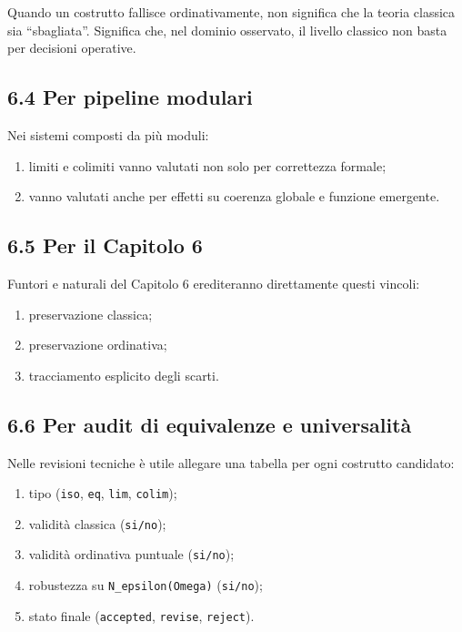 Quando un costrutto fallisce ordinativamente, non significa che la teoria classica sia ``sbagliata''. Significa che, nel dominio osservato, il livello classico non basta per decisioni operative.

\subsection{6.4 Per pipeline modulari}

Nei sistemi composti da più moduli:

\begin{enumerate}
\def\labelenumi{\arabic{enumi}.}
\tightlist
\item
  limiti e colimiti vanno valutati non solo per correttezza formale;
\item
  vanno valutati anche per effetti su coerenza globale e funzione emergente.
\end{enumerate}

\subsection{6.5 Per il Capitolo 6}

Funtori e naturali del Capitolo 6 erediteranno direttamente questi vincoli:

\begin{enumerate}
\def\labelenumi{\arabic{enumi}.}
\tightlist
\item
  preservazione classica;
\item
  preservazione ordinativa;
\item
  tracciamento esplicito degli scarti.
\end{enumerate}

\subsection{6.6 Per audit di equivalenze e universalità}

Nelle revisioni tecniche è utile allegare una tabella per ogni costrutto candidato:

\begin{enumerate}
\def\labelenumi{\arabic{enumi}.}
\tightlist
\item
  tipo (\texttt{iso}, \texttt{eq}, \texttt{lim}, \texttt{colim});
\item
  validità classica (\texttt{si/no});
\item
  validità ordinativa puntuale (\texttt{si/no});
\item
  robustezza su \texttt{N\_epsilon(Omega)} (\texttt{si/no});
\item
  stato finale (\texttt{accepted}, \texttt{revise}, \texttt{reject}).
\end{enumerate}

